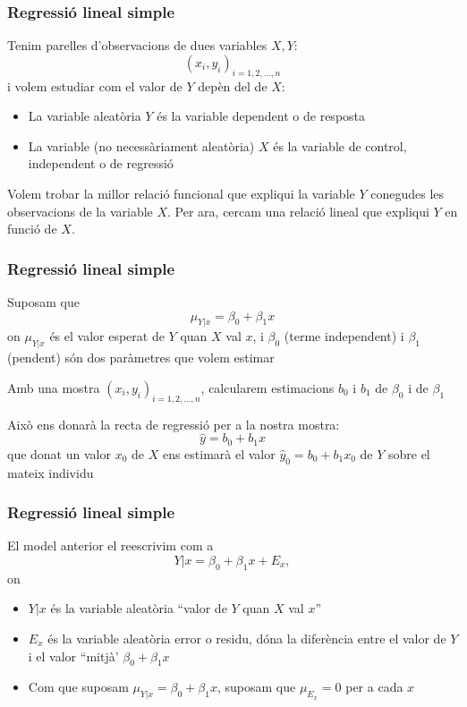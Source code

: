 \documentclass[12pt,t]{beamer}
\renewcommand{\emph}[1]{{\color{red}#1}}
\theoremstyle{plain}
\theoremstyle{definition}
\begin{document}
\begin{frame}
\frametitle{Regressió lineal simple}
Tenim parelles d'observacions de dues variables $X,Y$:
$$
(x_i,y_i)_{i=1,2,\ldots,n}
$$
i volem estudiar com el valor de $Y$ depèn del de $X$:
\medskip

\begin{itemize}
\item La variable aleatòria $Y$ és la variable \emph{dependent} o \emph{de resposta}

\item La variable (no necessàriament aleatòria) $X$ és la variable \emph{de control},
\emph{independent} o \emph{de regressió}
\end{itemize}
\bigskip

Volem trobar la millor relació funcional que  expliqui la variable $Y$ conegudes les observacions de la
variable $X$. Per ara, cercam una \emph{relació lineal} que expliqui $Y$ en funció de $X$.
\end{frame}

\begin{frame}
\frametitle{Regressió lineal simple}

Suposam que 
$$
\mu_{Y|x}=\beta_0+\beta_1 x
$$
on $\mu_{Y|x}$ és el valor esperat de $Y$ quan $X$ val $x$, i $\beta_0$
(\emph{terme independent}) i $\beta_1$ (\emph{pendent}) són dos
paràmetres que volem estimar
\medskip

Amb una mostra $(x_i,y_i)_{i=1,2,\ldots,n}$, calcularem estimacions $b_0$ i $b_1$ de
$\beta_0$ i de $\beta_1$
\medskip

Això ens donarà la \emph{recta de regressió} per a la nostra mostra:
$$
\widehat{y}=b_0+b_1 x
$$
que donat un valor $x_0$ de $X$ ens estimarà el valor $\widehat{y}_0=b_0+b_1 x_0$ de $Y$ sobre el mateix individu
\end{frame}

\begin{frame}
\frametitle{Regressió lineal simple}

El model anterior el reescrivim com a
$$
Y|x=\beta_0+\beta_1 x+ E_x,
$$
on
\begin{itemize}
\item $Y|x$ és la variable aleatòria ``valor de $Y$ quan $X$ val $x$''
\medskip

\item $E_x$ és la variable aleatòria \emph{error} o \emph{residu}, dóna la diferència entre el valor de $Y$ i el valor ``mitjà'  $\beta_0+\beta_1 x$
\medskip

\item Com que suposam $\mu_{Y|x}=\beta_0+\beta_1 x$, suposam que $\mu_{E_x}=0$ per a cada $x$
\end{itemize}

\end{frame}
\end{document}
